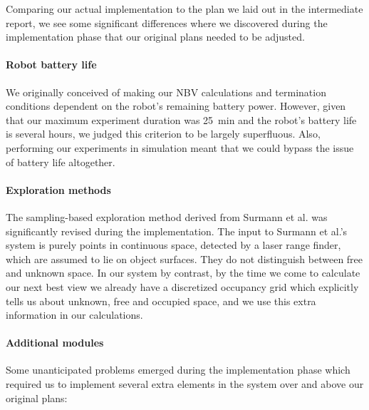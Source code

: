 Comparing our actual implementation to the plan we laid out in the intermediate report, we see some significant differences where we discovered during the implementation phase that our original plans needed to be adjusted.

\paragraph{Robot battery life} %
\label{par:robot_battery_life}

We originally conceived of making our NBV calculations and termination conditions dependent on the robot's remaining battery power.
However, given that our maximum experiment duration was \SI{25}{\minute} and the robot's battery life is several hours, we judged this criterion to be largely superfluous.
Also, performing our experiments in simulation meant that we could bypass the issue of battery life altogether.


\paragraph{Exploration methods} %
\label{par:exploration_methods}

The sampling-based exploration method derived from Surmann et al. \cite{surmann2003autonomous} was significantly revised during the implementation.
The input to Surmann et al.'s system is purely points in continuous space, detected by a laser range finder, which are assumed to lie on object surfaces.
They do not distinguish between free and unknown space.
In our system by contrast, by the time we come to calculate our next best view we already have a discretized occupancy grid which explicitly tells us about unknown, free and occupied space, and we use this extra information in our calculations.


\paragraph{Additional modules} %
\label{par:additional_modules}

Some unanticipated problems emerged during the implementation phase which required us to implement several extra elements in the system over and above our original plans:

